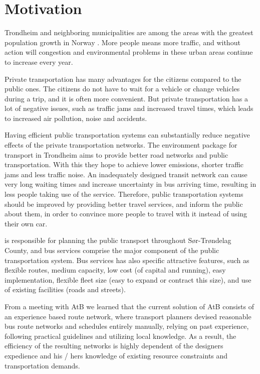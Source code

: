 \section{Motivation} 

Trondheim and neighboring municipalities are among the areas with the greatest population growth in Norway \citep{website:miljopakken}. More people means more traffic, and without action will congestion and environmental problems in these urban areas continue to increase every year. 

Private transportation has many advantages for the citizens compared to the public ones. The citizens do not have to wait for a vehicle or change vehicles during a trip, and it is often more convenient. But private transportation has a lot of negative issues, such as traffic jams and increased travel times, which leads to increased air pollution, noise and accidents. 

Having efficient public transportation systems can substantially reduce negative effects of the private transportation networks. The environment package \citep{website:miljopakken} for transport in Trondheim aims to provide better road networks and public transportation. With this they hope to achieve lower emissions, shorter traffic jams and less traffic noise. An inadequately designed transit network can cause very long waiting times and increase uncertainty in bus arriving time, resulting in less people taking use of the service. Therefore, public transportation systems should be improved by providing better travel services, and inform the public about them, in order to convince more people to travel with it instead of using their own car. 

\citet{website:atb} is responsible for planning the public transport throughout Sør-Trøndelag County, and bus services comprise the major component of the public transportation system. Bus services has also specific attractive features, such as flexible routes, medium capacity, low cost (of capital and running), easy implementation, flexible fleet size (easy to expand or contract this size), and use of existing facilities (roads and streets). %

From a meeting with AtB we learned that the current solution of AtB consists of an experience based route network, where transport planners devised reasonable bus route networks and schedules entirely manually, relying on past experience, following practical guidelines and utilizing local knowledge. As a result, the efficiency of the resulting networks is highly dependent of the designers expedience and his / hers knowledge of existing resource constraints and transportation demands. 
  
